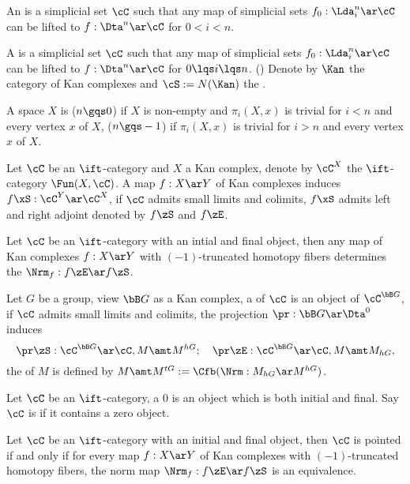 \documentclass[article, a4paper, twoside]{universal}
\begin{document}
\begin{dfn}[0.0.0.1, Page~12]
    An  is a simplicial set $\cC$ such that any map of simplicial sets $f_{0}:\Lda_{i}^{n}\ar\cC$ can be lifted to $f:\Dta^{n}\ar\cC$ for $0<i<n$.

    A  is a simplicial set $\cC$ such that any map of simplicial sets $f_{0}:\Lda_{i}^{n}\ar\cC$ can be lifted to $f:\Dta^{n}\ar\cC$ for $0\lqs i\lqs n$. (\cite[1.2.16.1]{Lurie2009}) Denote by $\Kan$ the category of Kan complexes and $\cS:=N(\Kan)$ the .

    A space $X$ is  ($n\gqs0$) if $X$ is non-empty and $\pi_{i}(X,x)$ is trivial for $i<n$ and every vertex $x$ of $X$,  ($n\gqs-1$) if $\pi_{i}(X,x)$ is trivial for $i>n$ and every vertex $x$ of $X$.
\end{dfn}

\begin{dfn}[6.1.6.1, 6.1.6.4]
    Let $\cC$ be an $\ift$-category and $X$ a Kan complex, denote by $\cC^{X}$ the $\ift$-category $\Fun(X,\cC)$. A map $f:X\ar Y$ of Kan complexes induces $f\xS:\cC^{Y}\ar\cC^{X}$, if $\cC$ admits small limits and colimits, $f\xS$ admits left and right adjoint denoted by $f\zS$ and $f\zE$.

    Let $\cC$ be an $\ift$-category with an intial and final object, then any map of Kan complexes $f:X\ar Y$ with $(-1)$-truncated homotopy fibers determines the  $\Nrm_{f}:f\zE\ar f\zS$.
\end{dfn}

\begin{dfn}[6.1.6.2, 6.1.6.24]
    Let $G$ be a group, view $\bB G$ as a Kan complex, a  of $\cC$ is an object of $\cC^{\bB G}$, if $\cC$ admits small limits and colimits, the projection $\pr:\bB G\ar\Dta^{0}$ induces
    \[
        \pr\zS:\cC^{\bB G}\ar\cC, M\amt M^{hG};\quad \pr\zE:\cC^{\bB G}\ar\cC, M\amt M_{hG},
    \]
    the  of $M$ is defined by $M\amt M^{tG}:=\Cfb(\Nrm:M_{hG}\ar M^{hG})$.
\end{dfn}

\begin{dfn}[1.1.1.1]
    Let $\cC$ be an $\ift$-category, a  $0$ is an object which is both initial and final. Say $\cC$ is  if it contains a zero object.
\end{dfn}

\begin{thm}[6.1.6.7]
    Let $\cC$ be an $\ift$-category with an initial and final object, then $\cC$ is pointed if and only if for every map $f:X\ar Y$ of Kan complexes with $(-1)$-truncated homotopy fibers, the norm map $\Nrm_{f}:f\zE\ar f\zS$ is an equivalence.
\end{thm}
\end{document}
